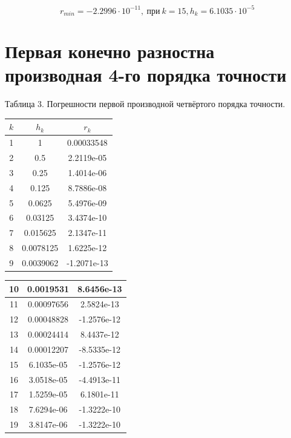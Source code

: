 \documentclass{article}
\begin{document}
	
	\[r_{min} = -2.2996\cdot 10^{-11},~ \text{при} ~ k=15, h_k=6.1035\cdot 10^{-5}\]
	
	\section{Первая конечно разностна производная 4-го порядка точности}
	
		\begin{flushright}
			Таблица 3. Погрешности первой производной четвёртого порядка точности.
		\end{flushright}
		\begin{table}[h!]
			\centering
			\begin{tabular}{|c|c|c|}
				\hline
				$k$  & $h_k$       & $r_k$        \\ \hline
				1  & 1          & 0.00033548  \\ \hline
				2  & 0.5        & 2.2119e-05  \\ \hline
				3  & 0.25       & 1.4014e-06  \\ \hline
				4  & 0.125      & 8.7886e-08  \\ \hline
				5  & 0.0625     & 5.4976e-09  \\ \hline
				6  & 0.03125    & 3.4374e-10  \\ \hline
				7  & 0.015625   & 2.1347e-11  \\ \hline
				8  & 0.0078125  & 1.6225e-12  \\ \hline
				9  & 0.0039062  & -1.2071e-13 \\ \hline
			\end{tabular}
		\end{table}


		\begin{table}[h!]
			\centering
			\begin{tabular}{|c|c|c|}
				\hline
		
					10 & 0.0019531  & 8.6456e-13  \\ \hline
					11 & 0.00097656 & 2.5824e-13  \\ \hline
					12 & 0.00048828 & -1.2576e-12 \\ \hline
					13 & 0.00024414 & 8.4437e-12  \\ \hline
					14 & 0.00012207 & -8.5335e-12 \\ \hline
					15 & 6.1035e-05 & -1.2576e-12 \\ \hline
					16 & 3.0518e-05 & -4.4913e-11 \\ \hline
					17 & 1.5259e-05 & 6.1801e-11  \\ \hline
					18 & 7.6294e-06 & -1.3222e-10 \\ \hline
					19 & 3.8147e-06 & -1.3222e-10 \\ \hline
				\end{tabular}
		\end{table}
\end{document}
